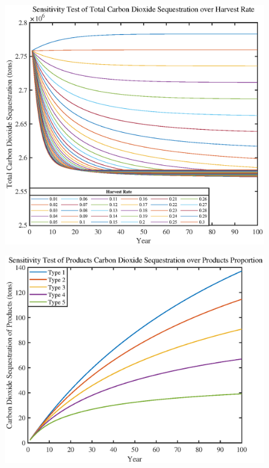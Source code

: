\documentclass{mcmthesis}
\numberwithin{figure}{section}
\numberwithin{table}{section}
\numberwithin{equation}{section}
\begin{document}
\begin{figure}[htbp]
  \centering
  \includegraphics[width = 12cm]{code&pic/HarvestRate.eps}
\end{figure}

\begin{figure}[htbp]
  \centering
  \includegraphics[width = 12cm]{code&pic/proportion.eps}
\end{figure}
\end{document}

